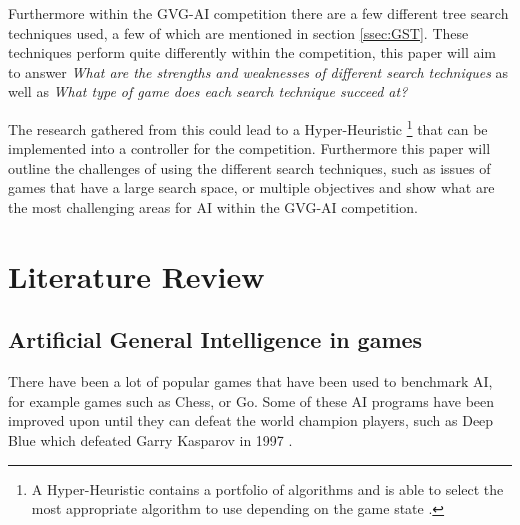 \documentclass[journal]{IEEEtran}
\begin{document}
	Furthermore within the GVG-AI competition there are a few different tree search techniques used, a few of which are mentioned in section \ref{ssec:GST}. 
	These techniques perform quite differently within the competition, this paper will aim to answer \textit{What are the strengths and weaknesses of different search techniques} as well as \textit{What type of game does each search technique succeed at?}


	
	The research gathered from this could lead to a Hyper-Heuristic \footnote{A Hyper-Heuristic contains a portfolio of algorithms and is able to select the most appropriate algorithm to use depending on the game state \cite{hyperHeurisicMendes, horn2016mcts}.}  that can be implemented into a controller for the competition. 
	Furthermore this paper will outline the challenges of using the different search techniques, such as issues of games that have a large search space, or multiple objectives and show what are the most challenging areas for AI within the GVG-AI competition.
	





\section{Literature Review}
	\subsection{Artificial General Intelligence in games}
		
		There have been a lot of popular games that have been used to benchmark AI, for example games such as Chess, or Go. Some of these AI programs have been improved upon until they can defeat the world champion players, such as Deep Blue which defeated Garry Kasparov in 1997 \cite{DeepBlue, shannon1988programming, DeepBlueOverview}. 
\end{document}
